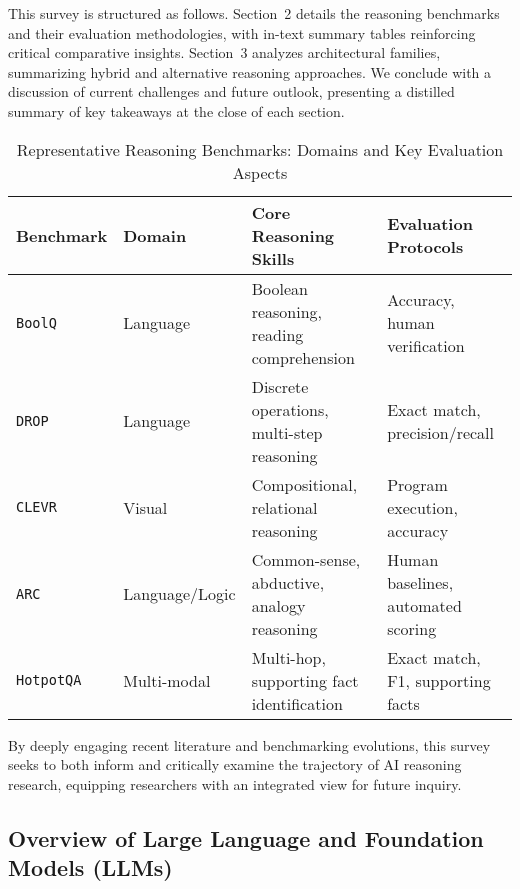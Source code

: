 \documentclass[sigconf]{acmart}
\begin{document}
This survey is structured as follows. Section~2 details the reasoning benchmarks and their evaluation methodologies, with in-text summary tables reinforcing critical comparative insights. Section~3 analyzes architectural families, summarizing hybrid and alternative reasoning approaches. We conclude with a discussion of current challenges and future outlook, presenting a distilled summary of key takeaways at the close of each section.

\begin{table*}[htbp]
\centering
\caption{Representative Reasoning Benchmarks: Domains and Key Evaluation Aspects}
\label{tab:benchmarks}
\begin{adjustbox}{max width=\textwidth}
\begin{tabular}{@{}llll@{}}
\toprule
Benchmark & Domain & Core Reasoning Skills & Evaluation Protocols \\
\midrule
\texttt{BoolQ}        & Language        & Boolean reasoning, reading comprehension    & Accuracy, human verification      \\
\texttt{DROP}         & Language        & Discrete operations, multi-step reasoning   & Exact match, precision/recall     \\
\texttt{CLEVR}        & Visual          & Compositional, relational reasoning         & Program execution, accuracy       \\
\texttt{ARC}          & Language/Logic  & Common-sense, abductive, analogy reasoning  & Human baselines, automated scoring\\
\texttt{HotpotQA}     & Multi-modal     & Multi-hop, supporting fact identification   & Exact match, F1, supporting facts \\
\bottomrule
\end{tabular}
\end{adjustbox}
\end{table*}

By deeply engaging recent literature and benchmarking evolutions, this survey seeks to both inform and critically examine the trajectory of AI reasoning research, equipping researchers with an integrated view for future inquiry.

\subsection{Overview of Large Language and Foundation Models (LLMs)}
\end{document}
